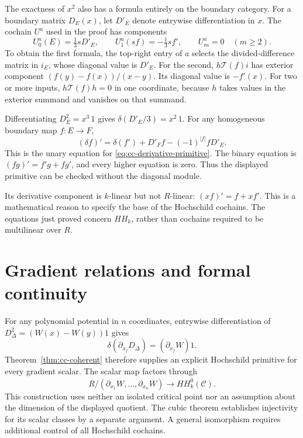 The exactness of \(x^2\) also has a formula entirely on the
boundary category. For a boundary matrix \(D_E(x)\), let
\(D'_E\) denote entrywise differentiation in \(x\).
The cochain \(U^a\) used in the proof has components
\begin{equation}
 U^a_0(E)=\tfrac13sD'_E,\qquad
 U^a_1(sf)=-\tfrac13s f',\qquad U^a_m=0\quad(m\geq2).
 \label{eq:cc-derivative-primitive}
\end{equation}
To obtain the first formula, the top-right entry of \(a\)
selects the divided-difference matrix in \(i_E\), whose
diagonal value is \(D'_E\).
For the second, \(h\mathcal T(f)i\) has exterior component
\((f(y)-f(x))/(x-y)\). Its diagonal value is \(-f'(x)\).
For two or more inputs, \(h\mathcal T(f)h=0\) in one
coordinate, because \(h\) takes values in the exterior summand
and vanishes on that summand.

Differentiating \(D_E^2=x^3\,1\) gives
\(\delta(D'_E/3)=x^2\,1\).
For any homogeneous boundary map \(f:E\to F\),
\[
 (\delta f)'=\delta(f')+D'_Ff-(-1)^{|f|}fD'_E.
\]
This is the unary equation for
\eqref{eq:cc-derivative-primitive}. The binary equation is
\((fg)'=f'g+fg'\), and every higher equation is zero.
Thus the displayed primitive can be checked without the
diagonal module.

Its derivative component is \(k\)-linear but not \(R\)-linear:
\((xf)'=f+xf'\). This is a mathematical reason to specify the
base of the Hochschild cochains. The equations just proved
concern \(HH_k\), rather than cochains required to be
multilinear over \(R\).

\section{Gradient relations and formal continuity}
\label{sec:cc-gradient}

For any polynomial potential in \(n\) coordinates, entrywise
differentiation of \(D_\Delta^2=(W(x)-W(y))1\) gives
\[
 \delta(\partial_{x_j}D_\Delta)=(\partial_{x_j}W)1.
\]
Theorem~\ref{thm:cc-coherent} therefore supplies an explicit
Hochschild primitive for every gradient scalar.
The scalar map factors through
\[
 R/(\partial_{x_1}W,\ldots,\partial_{x_n}W)
       \longrightarrow HH_k^{\bar0}(\mathcal C).
\]
This construction uses neither an isolated critical point nor
an assumption about the dimension of the displayed quotient.
The cubic theorem establishes injectivity for its scalar
classes by a separate argument. A general isomorphism requires
additional control of all Hochschild cochains.

